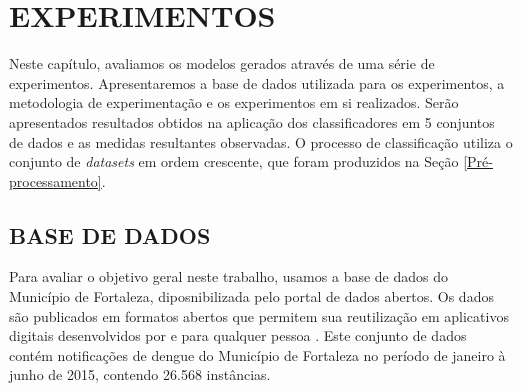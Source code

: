 \documentclass[
	12pt,				%
	openright,			%
	oneside,	
	a4paper,				%
	english,				%
	brazil				%
]{abntex2/abntex2} %
\begin{document}
\chapter{EXPERIMENTOS}

	Neste capítulo, avaliamos os modelos gerados através de uma série de experimentos. Apresentaremos a base de dados utilizada para os experimentos, a metodologia de experimentação e os experimentos em si realizados. Serão apresentados resultados obtidos na aplicação dos classificadores em  5  conjuntos de dados e as medidas resultantes observadas. O processo de classificação utiliza o conjunto de \textit{datasets} em ordem crescente, que foram  produzidos na Seção \ref{Pré-processamento}. %
	\vspace{-1.5\baselineskip}
	\section{BASE DE DADOS}
	\vspace{1\baselineskip}
	Para avaliar o objetivo geral neste trabalho, usamos a base de dados  do Município de Fortaleza, diposnibilizada pelo portal de dados abertos. Os dados são publicados em formatos abertos que permitem sua reutilização  em aplicativos digitais desenvolvidos por e para qualquer pessoa \cite{fortaleza:2015}. Este conjunto de dados contém notificações de dengue do Município de Fortaleza no período de janeiro à junho de 2015, contendo 26.568 instâncias. %
	

\end{document}
